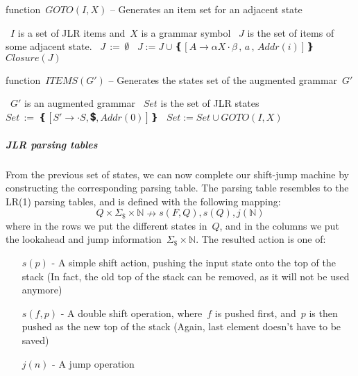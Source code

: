 \begin{algorithm}[p]
  \caption{\label{Algorithm:Goto}
  function~$GOTO(I,X)$ -- Generates an item set for an adjacent state}
  \begin{algorithmic}
    \REQUIRE~$I$ is a set of JLR items and~$X$ is a grammar symbol
    \ENSURE~$J$ is the set of items of some adjacent state.
    \STATE~$J \, := \,∅$
      \STATE~$ J := J∪❴ [ A→αX·β\, , \, a \, , \, Addr(i) ] ❵$
    \ENDFOR
    \RETURN~$Closure(J)$
  \end{algorithmic}
\end{algorithm}

\begin{algorithm}[p]
  \caption{\label{Algorithm:States}
  function~$ITEMS(G')$ -- Generates the states set of the augmented grammar~$G'$}
  \begin{algorithmic}
    \REQUIRE~$G'$ is an augmented grammar
    \ENSURE~$Set$ is the set of JLR states
    \STATE~$Set \, := \, ❴[S'→·S , 💲 , Addr(0)]❵$
    \REPEAT
      \STATE~$ Set := Set ∪ GOTO(I,X)$
    \ENDIF
  \ENDFOR
      \ENDFOR
  \end{algorithmic}
\end{algorithm}

\subparagraph*{JLR parsing tables}
From the previous set of states, we can now
  complete our shift-jump machine by constructing
  the corresponding parsing table.
The parsing table resembles to the LR(1)
  parsing tables, and is defined with
  the following mapping:
\[
  Q \times \Sigma_\$ \times \mathbb{N} \nrightarrow { s( F , Q ) , s ( Q ) , j ( \mathbb{N} ) }
\]
 where in the rows we put the different states in~$Q$,
 and in the columns we put the lookahead and jump information~$ \Sigma_\$ \times \mathbb{N}$.
The resulted action is one of:
\begin{itemize}
  \item[$s(p)$] - A simple shift action, pushing the input state onto the top of the stack
    (In fact, the old top of the stack can be removed, as it will not be used anymore)
  \item[$s(f,p)$] - A double shift operation, where~$f$ is pushed first, and~$p$ is then
    pushed as the new top of the stack (Again, last element doesn't have to be saved)
  \item[$j(n)$] - A jump operation
\end{itemize}
